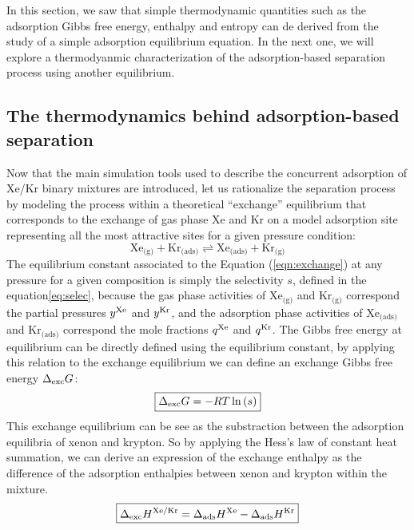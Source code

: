 \documentclass[main.tex]{subfiles}
\begin{document}
In this section, we saw that simple thermodynamic quantities such as the adsorption Gibbs free energy, enthalpy and entropy can de derived from the study of a simple adsorption equilibrium equation. In the next one, we will explore a thermodyanmic characterization of the adsorption-based separation process using another equilibrium. 

\subsection{The thermodynamics behind adsorption-based separation}\label{section:exchange}

Now that the main simulation tools used to describe the concurrent adsorption of Xe/Kr binary mixtures are introduced, let us rationalize the separation process by modeling the process within a theoretical ``exchange'' equilibrium that corresponds to the exchange of gas phase Xe and Kr on a model adsorption site representing all the most attractive sites for a given pressure condition:
\begin{equation} \label{eqn:exchange}
    \text{Xe}_{\text{(g)}} + \text{Kr}_{\text{(ads)}}
    \rightleftharpoons \text{Xe}_{\text{(ads)}} + \text{Kr}_{\text{(g)}}
\end{equation}
The equilibrium constant associated to the Equation (\ref{eqn:exchange}) at any pressure for a given composition is simply the selectivity $s$, defined in the equation\ref{eq:selec}, because the gas phase activities of $\text{Xe}_{\text{(g)}}$ and $\text{Kr}_{\text{(g)}}$ correspond the partial pressures $y^{\text{Xe}}$ and $y^{\text{Kr}}$, and the adsorption phase activities of $\text{Xe}_{\text{(ads)}}$ and $\text{Kr}_{\text{(ads)}}$ correspond the mole fractions $q^{\text{Xe}}$ and $q^{\text{Kr}}$. The Gibbs free energy at equilibrium can be directly defined using the equilibrium constant, by applying this relation to the exchange equilibrium we can define an exchange Gibbs free energy $\Delta_{\text{exc}}G$:
\begin{equation}
  \boxed{
  \Delta_{\text{exc}}G = -RT \ln\left(s\right)
  }
\end{equation}
This exchange equilibrium can be see as the substraction between the adsorption equilibria of xenon and krypton. So by applying the Hess's law of constant heat summation, we can derive an expression of the exchange enthalpy as the difference of the adsorption enthalpies between xenon and krypton within the mixture. 
\begin{equation}
  \boxed{
  \Delta_{\text{exc}}H^{\text{Xe/Kr}} = \Delta_{\text{ads}}H^{\text{Xe}} - \Delta_{\text{ads}}H^{\text{Kr}}
  }
\end{equation}
\end{document}
